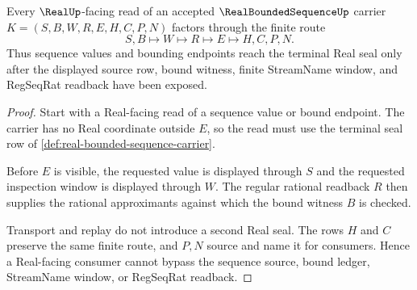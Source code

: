 \begin{theorem}
\label{thm:real-bounded-sequence-real-seal-handoff}
Every $\RealUp$-facing read of an accepted $\RealBoundedSequenceUp$ carrier $K=(S,B,W,R,E,H,C,P,N)$ factors through the finite route
$$
S,B \longmapsto W \longmapsto R \longmapsto E \longmapsto H,C,P,N .
$$
Thus sequence values and bounding endpoints reach the terminal Real seal only after the displayed source row, bound witness, finite StreamName window, and RegSeqRat readback have been exposed.
\end{theorem}
\begin{proof}
Start with a Real-facing read of a sequence value or bound endpoint. The carrier has no Real coordinate outside $E$, so the read must use the terminal seal row of \autoref{def:real-bounded-sequence-carrier}.

Before $E$ is visible, the requested value is displayed through $S$ and the requested inspection window is displayed through $W$. The regular rational readback $R$ then supplies the rational approximants against which the bound witness $B$ is checked.

Transport and replay do not introduce a second Real seal. The rows $H$ and $C$ preserve the same finite route, and $P,N$ source and name it for consumers. Hence a Real-facing consumer cannot bypass the sequence source, bound ledger, StreamName window, or RegSeqRat readback.
\end{proof}

